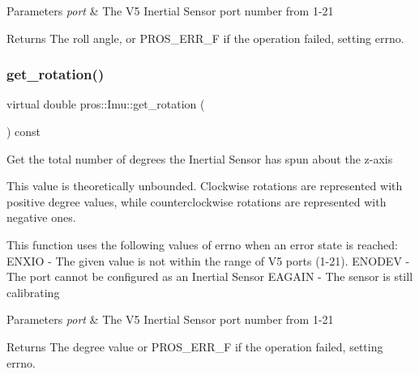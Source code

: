 \begin{DoxyParams}{Parameters}
{\em port} & The V5 Inertial Sensor port number from 1-\/21 \\
\hline
\end{DoxyParams}
\begin{DoxyReturn}{Returns}
The roll angle, or P\+R\+O\+S\+\_\+\+E\+R\+R\+\_\+F if the operation failed, setting errno. 
\end{DoxyReturn}
\mbox{\label{classpros_1_1Imu_ac8bd7a19a6b4fc0c207a895efd3f0b48}} 
\subsubsection{\texorpdfstring{get\+\_\+rotation()}{get\_rotation()}}
{\footnotesize\ttfamily virtual double pros\+::\+Imu\+::get\+\_\+rotation (\begin{DoxyParamCaption}{ }\end{DoxyParamCaption}) const\hspace{0.3cm}{\ttfamily [virtual]}}

Get the total number of degrees the Inertial Sensor has spun about the z-\/axis

This value is theoretically unbounded. Clockwise rotations are represented with positive degree values, while counterclockwise rotations are represented with negative ones.

This function uses the following values of errno when an error state is reached\+: E\+N\+X\+IO -\/ The given value is not within the range of V5 ports (1-\/21). E\+N\+O\+D\+EV -\/ The port cannot be configured as an Inertial Sensor E\+A\+G\+A\+IN -\/ The sensor is still calibrating


\begin{DoxyParams}{Parameters}
{\em port} & The V5 Inertial Sensor port number from 1-\/21 \\
\hline
\end{DoxyParams}
\begin{DoxyReturn}{Returns}
The degree value or P\+R\+O\+S\+\_\+\+E\+R\+R\+\_\+F if the operation failed, setting errno. 
\end{DoxyReturn}
\mbox{\label{classpros_1_1Imu_ad38c8f55b89f8d2e7b68a6bda0029559}} 
